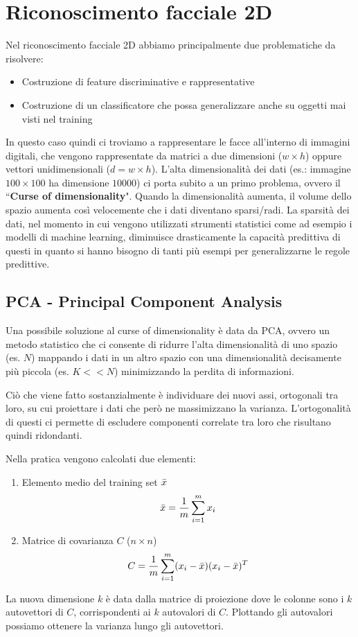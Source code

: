 \documentclass{article}
\begin{document}
\section{Riconoscimento facciale 2D}
Nel riconoscimento facciale 2D abbiamo principalmente due problematiche da risolvere:
\begin{itemize}
    \item Costruzione di feature discriminative e rappresentative
    \item Costruzione di un classificatore che possa generalizzare anche su oggetti mai visti nel training
\end{itemize}

In questo caso quindi ci troviamo a rappresentare le facce all'interno di immagini digitali, che vengono rappresentate da matrici a due dimensioni ($w\times h$) oppure vettori unidimensionali ($d=w\times h$). L'alta dimensionalità dei dati (es.: immagine $100 \times 100$ ha dimensione $10000$) ci porta subito a un primo problema, ovvero il ``\textbf{Curse of dimensionality}".
Quando la dimensionalità aumenta, il volume dello spazio aumenta così velocemente che i dati diventano sparsi/radi. 
La sparsità dei dati, nel momento in cui vengono utilizzati strumenti statistici come ad esempio i modelli di machine learning, diminuisce drasticamente la capacità predittiva di questi in quanto si hanno bisogno di tanti più esempi per generalizzarne le regole predittive.

\subsection{PCA - Principal Component Analysis}
Una possibile soluzione al curse of dimensionality è data da PCA, ovvero un metodo statistico che ci consente di ridurre l'alta dimensionalità di uno spazio (es. $N$) mappando i dati in un altro spazio con una dimensionalità decisamente più piccola (es. $K << N$) minimizzando la perdita di informazioni.

Ciò che viene fatto sostanzialmente è individuare dei nuovi assi, ortogonali tra loro, su cui proiettare i dati che però ne massimizzano la varianza. L'ortogonalità di questi ci permette di escludere componenti correlate tra loro che risultano quindi ridondanti.

\bigskip
Nella pratica vengono calcolati due elementi:
\begin{enumerate}
    \item Elemento medio del training set $\Bar{x}$
    $$\Bar{x} = \frac{1}{m} \sum_{i=1}^{m} x_i$$
    \item Matrice di covarianza $C$ ($n \times n$)
    $$C = \frac{1}{m} \sum_{i=1}^{m} (x_i - \Bar{x})(x_i - \Bar{x})^T $$
\end{enumerate}
La nuova dimensione $k$ è data dalla matrice di proiezione dove le colonne sono i $k$ autovettori di $C$, corrispondenti ai $k$ autovalori di $C$. Plottando gli autovalori possiamo ottenere la varianza lungo gli autovettori.
\end{document}
